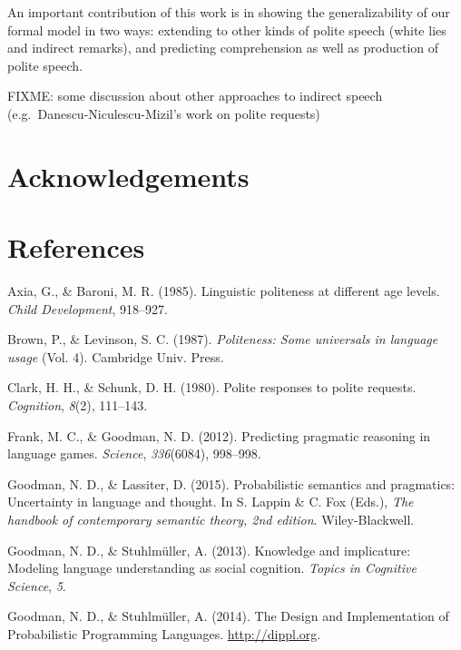 \documentclass[10pt, letterpaper]{article}
\begin{document}
An important contribution of this work is in showing the
generalizability of our formal model in two ways: extending to other
kinds of polite speech (white lies and indirect remarks), and predicting
comprehension as well as production of polite speech.

FIXME: some discussion about other approaches to indirect speech
(e.g.~Danescu-Niculescu-Mizil's work on polite requests)

\section{Acknowledgements}\label{acknowledgements}

\section{References}\label{references}

\setlength{\parindent}{-0.1in} \setlength{\leftskip}{0.125in} \noindent

\hypertarget{refs}{}
\hypertarget{ref-axia1985}{}
Axia, G., \& Baroni, M. R. (1985). Linguistic politeness at different
age levels. \emph{Child Development}, 918--927.

\hypertarget{ref-Brown1987}{}
Brown, P., \& Levinson, S. C. (1987). \emph{Politeness: Some universals
in language usage} (Vol. 4). Cambridge Univ. Press.

\hypertarget{ref-clark1980}{}
Clark, H. H., \& Schunk, D. H. (1980). Polite responses to polite
requests. \emph{Cognition}, \emph{8}(2), 111--143.

\hypertarget{ref-Frank2012}{}
Frank, M. C., \& Goodman, N. D. (2012). Predicting pragmatic reasoning
in language games. \emph{Science}, \emph{336}(6084), 998--998.

\hypertarget{ref-GoodmanLassiter2015}{}
Goodman, N. D., \& Lassiter, D. (2015). Probabilistic semantics and
pragmatics: Uncertainty in language and thought. In S. Lappin \& C. Fox
(Eds.), \emph{The handbook of contemporary semantic theory, 2nd
edition}. Wiley-Blackwell.

\hypertarget{ref-Goodman2013}{}
Goodman, N. D., \& Stuhlmüller, A. (2013). Knowledge and implicature:
Modeling language understanding as social cognition. \emph{Topics in
Cognitive Science}, \emph{5}.

\hypertarget{ref-dippl}{}
Goodman, N. D., \& Stuhlmüller, A. (2014). The Design and Implementation
of Probabilistic Programming Languages. \url{http://dippl.org}.
\end{document}
